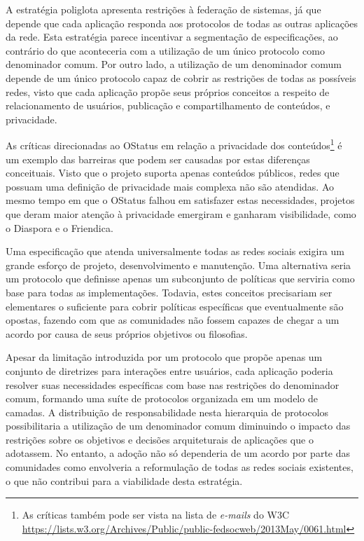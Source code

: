 A estratégia poliglota apresenta restrições à federação de sistemas, já que depende
que cada aplicação responda aos protocolos de todas as outras aplicações da rede.
Esta estratégia parece incentivar a segmentação de especificações, ao contrário do
que aconteceria com a utilização de um único protocolo como denominador comum. Por
outro lado, a utilização de um denominador comum depende de um único protocolo capaz
de cobrir as restrições de todas as possíveis redes, visto que cada aplicação propõe
seus próprios conceitos a respeito de relacionamento de usuários, publicação e
compartilhamento de conteúdos, e privacidade.

As críticas direcionadas ao OStatus em relação a privacidade dos
conteúdos\footnote{As críticas também pode ser vista na lista de \textit{e-mails} do
W3C \url{https://lists.w3.org/Archives/Public/public-fedsocweb/2013May/0061.html}} é
um exemplo das barreiras que podem ser causadas por estas diferenças conceituais.
Visto que o projeto suporta apenas conteúdos públicos, redes que possuam uma
definição de privacidade mais complexa não são atendidas. Ao mesmo tempo em que o
OStatus falhou em satisfazer estas necessidades, projetos que deram maior atenção à
privacidade emergiram e ganharam visibilidade, como o Diaspora e o Friendica.

Uma especificação que atenda universalmente todas as redes sociais exigira um grande
esforço de projeto, desenvolvimento e manutenção. Uma alternativa seria um protocolo
que definisse apenas um subconjunto de políticas que serviria como base para todas
as implementações. Todavia, estes conceitos precisariam ser elementares o suficiente
para cobrir políticas específicas que eventualmente são opostas, fazendo com que as
comunidades não fossem capazes de chegar a um acordo por causa de seus próprios
objetivos ou filosofias.

Apesar da limitação introduzida por um protocolo que propõe apenas um conjunto de
diretrizes para interações entre usuários, cada aplicação poderia resolver suas
necessidades específicas com base nas restrições do denominador comum, formando uma
suíte de protocolos organizada em um modelo de camadas. A distribuição de
responsabilidade nesta hierarquia de protocolos possibilitaria a utilização de um
denominador comum diminuindo o impacto das restrições sobre os objetivos e decisões
arquiteturais de aplicações que o adotassem. No entanto, a adoção não só dependeria
de um acordo por parte das comunidades como envolveria a reformulação de todas as
redes sociais existentes, o que não contribui para a viabilidade desta estratégia.

